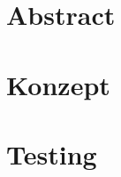 \documentclass[a4paper,twoside,10pt]{article}
\begin{document}
\pagestyle{empty} %

\pagestyle{fancy} %
\newpage
\tableofcontents
\listoffigures

\section{Abstract} %
\label{sec:Abstract}

\section{Konzept} %
\label{sec:Konzept}

\section{Testing} %
\label{sec:Testing}
\end{document}

